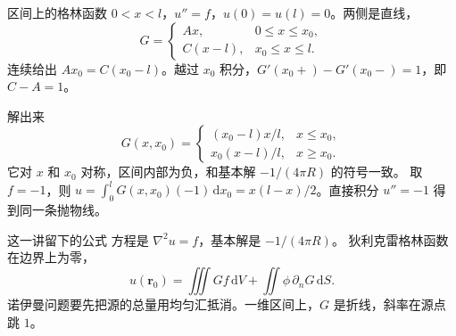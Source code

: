 \documentclass[fontset=windows, chinese, 10pt, xcolor=dvipsnames]{beamer}
\begin{document}
\begin{frame}{区间上的格林函数}
  $0<x<l$，$u''=f$，$u(0)=u(l)=0$。两侧是直线，
  \[
    G=
    \begin{cases}
      A x, & 0\leq x\leq x_0,\\
      C(x-l), & x_0\leq x\leq l.
    \end{cases}
  \]
  连续给出 $A x_0=C(x_0-l)$。越过 $x_0$ 积分，$G'(x_0+)-G'(x_0-)=1$，即 $C-A=1$。
\end{frame}

\begin{frame}{解出来}
  \begin{equation*}
    \boxed{\displaystyle
    G(x,x_0)=
    \begin{cases}
      (x_0-l)x/l, & x\leq x_0,\\
      x_0(x-l)/l, & x\geq x_0.
    \end{cases}}
  \end{equation*}
  它对 $x$ 和 $x_0$ 对称，区间内部为负，和基本解 $-1/(4\pi R)$ 的符号一致。
  \vspace{0.35em}
  取 $f=-1$，则 $u=\int_0^l G(x,x_0)(-1)\,\mathrm{d}x_0=x(l-x)/2$。直接积分 $u''=-1$ 得到同一条抛物线。
\end{frame}

\begin{frame}{这一讲留下的公式}
  方程是 $\nabla^2 u=f$，基本解是 $-1/(4\pi R)$。
  \vspace{0.35em}
  狄利克雷格林函数在边界上为零，
  \[
    u(\mathbf{r}_0)
    =\iiint G f\,\mathrm{d}V
    +\iint\phi\,\partial_n G\,\mathrm{d}S.
  \]
  诺伊曼问题要先把源的总量用均匀汇抵消。一维区间上，$G$ 是折线，斜率在源点跳 $1$。
\end{frame}
\end{document}
